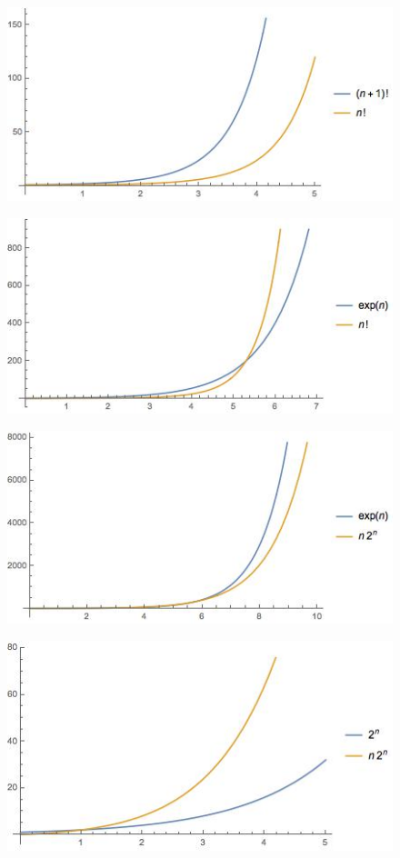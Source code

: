 \documentclass[11 pt, a4paper]{article}
\theoremstyle{definition}
\begin{document}
\begin{enumerate}
\begin{figure}[H]
          \includegraphics[trim=0cm 0cm 0cm 0cm, width=12cm]{3.jpg} 
      \end{figure} \begin{figure}[H]
         \centering
          \includegraphics[trim=0cm 0cm 0cm 0cm, width=12cm]{4.jpg} 
      \end{figure} \begin{figure}[H]
         \centering
          \includegraphics[trim=0cm 0cm 0cm 0cm, width=12cm]{5.jpg} 
      \end{figure} \begin{figure}[H]
         \centering
          \includegraphics[trim=0cm 0cm 0cm 0cm, width=12cm]{6.jpg} 

\end{figure}
\end{enumerate}
\end{document}
